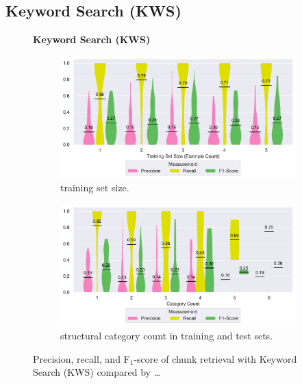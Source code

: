 \subsection{Keyword Search (KWS)}
\label{sec:r:kws}
\begin{figure}
\centering
    \textbf{Keyword Search (KWS)}\par\medskip
\begin{subfigure}[b]{\columnwidth}
		\centering
		\includegraphics[width=\columnwidth,
		clip]{img/big-study/recall-precision-examplecount-KWS.pdf}
		\caption{training set size.}
		\label{fig:recall-precision-examplecount-KWS}
\end{subfigure}\hspace{\fill}
\begin{subfigure}[b]{\columnwidth}
		\centering
		\includegraphics[width=\columnwidth,
		clip]{img/big-study/recall-precision-categorycount-KWS.pdf}
		\caption{structural category count
		in training and test sets.}
		\label{fig:recall-precision-categorycount-KWS}
\end{subfigure}
\caption{Precision, recall, and F$_{1}$-score of chunk retrieval with
Keyword Search (KWS) compared by \ldots}
\label{fig:results-KWS}
\end{figure}


